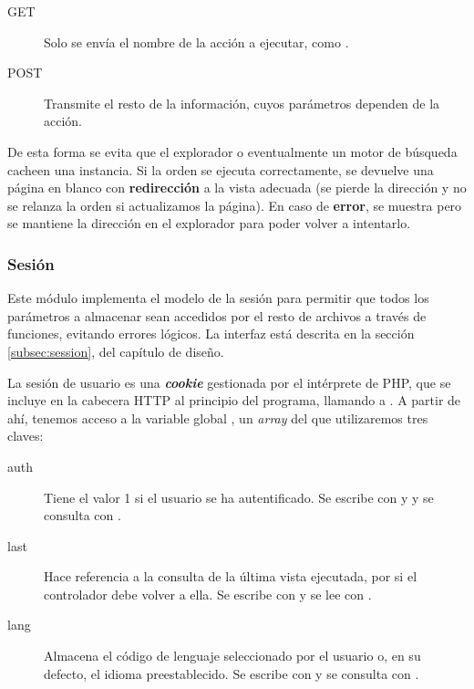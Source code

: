 \begin{description}
	\item[GET] Solo se envía el nombre de la acción a ejecutar, como .
	\item[POST] Transmite el resto de la información, cuyos parámetros dependen de la acción.
\end{description}

De esta forma se evita que el explorador o eventualmente un motor de búsqueda cacheen una instancia. Si la orden se ejecuta correctamente, se devuelve una página en blanco con \textbf{redirección} a la vista adecuada (se pierde la dirección y no se relanza la orden si actualizamos la página). En caso de \textbf{error}, se muestra pero se mantiene la dirección en el explorador para poder volver a intentarlo.

\subsubsection{Sesión}

Este módulo implementa el modelo de la sesión para permitir que todos los parámetros a almacenar sean accedidos por el resto de archivos a través de funciones, evitando errores lógicos. La interfaz está descrita en la sección \ref{subsec:session}, del capítulo de diseño.

La sesión de usuario es una \textbf{\textit{cookie}} gestionada por el intérprete de PHP, que se incluye en la cabecera \acrshort{HTTP} al principio del programa, llamando a . A partir de ahí, tenemos acceso a la variable global , un \textit{array} del que utilizaremos tres claves:

\begin{description}
	\item[auth] Tiene el valor 1 si el usuario se ha autentificado. Se escribe con  y  y se consulta con .
	
	\item[last] Hace referencia a la consulta de la última vista ejecutada, por si el controlador debe volver a ella. Se escribe con  y se lee con .
	
	\item[lang] Almacena el código de lenguaje seleccionado por el usuario o, en su defecto, el idioma preestablecido. Se escribe con  y se consulta con .
\end{description}

